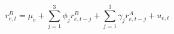 \par\needspace{88pt}\begin{minipage}{\linewidth}
\begin{equation}r^B_{e,t}=\mu_e+\sum_{j=1}^{3}\phi_j r^B_{e,t-j}+\sum_{j=1}^{3}\gamma_j r^A_{e,t-j}+u_{e,t}\label{eq:16}\end{equation}
\end{minipage}\par
